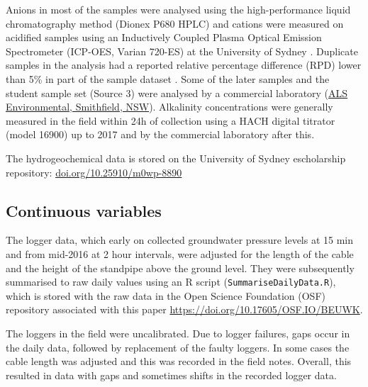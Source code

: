 \documentclass[, manuscript]{copernicus}
\begin{document}
Anions in most of the samples were analysed using the high-performance
liquid chromatography method (Dionex P680 HPLC) and cations were
measured on acidified samples using an Inductively Coupled Plasma
Optical Emission Spectrometer (ICP-OES, Varian 720-ES) at the University
of Sydney \citep{Akter2018}. Duplicate samples in the analysis had a
reported relative percentage difference (RPD) lower than 5\% in part of
the sample dataset \citep{Akter2018}. Some of the later samples and the
student sample set (Source 3) were analysed by a commercial laboratory
(\href{https://www.alsglobal.com/en/locations/asia-pacific/pacific/australia/nsw/sydney-woodpark-environmental}{ALS
Environmental, Smithfield, NSW}). Alkalinity concentrations were
generally measured in the field within 24h of collection using a HACH
digital titrator (model 16900) \citep{Akter2018} up to 2017 and by the
commercial laboratory after this.

The hydrogeochemical data is stored on the University of Sydney
escholarship repository: \url{doi.org/10.25910/m0wp-8890}

\subsection{Continuous variables}

The logger data, which early on collected groundwater pressure levels at
15 min and from mid-2016 at 2 hour intervals, were adjusted for the
length of the cable and the height of the standpipe above the ground
level. They were subsequently summarised to raw daily values using an R
script (\texttt{SummariseDailyData.R}), which is stored with the raw
data in the Open Science Foundation (OSF) repository associated with
this paper \url{https://doi.org/10.17605/OSF.IO/BEUWK}.

The loggers in the field were uncalibrated. Due to logger failures, gaps
occur in the daily data, followed by replacement of the faulty loggers.
In some cases the cable length was adjusted and this was recorded in the
field notes. Overall, this resulted in data with gaps and sometimes
shifts in the recorded logger data.
\end{document}

